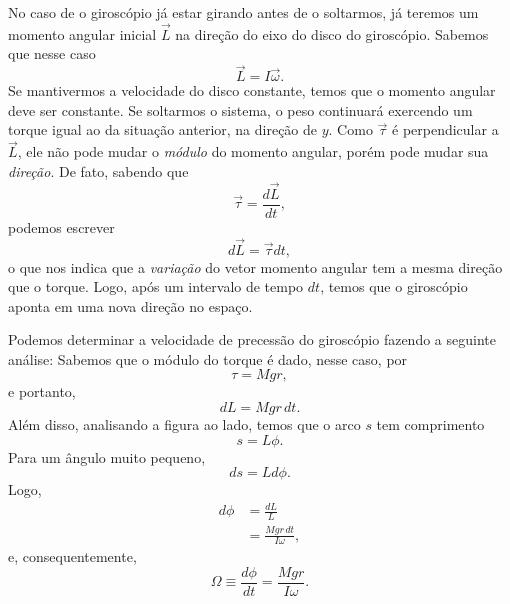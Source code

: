 No caso de o giroscópio já estar girando antes de o soltarmos, já teremos um momento angular inicial $\vec{L}$ na direção do eixo do disco do giroscópio. Sabemos que nesse caso 
\begin{equation}
  \vec{L} = I\vec{\omega}.
\end{equation}
%
Se mantivermos a velocidade do disco constante, temos que o momento angular deve ser constante. Se soltarmos o sistema, o peso continuará exercendo um torque igual ao da situação anterior, na direção de $y$. Como $\vec{\tau}$ é perpendicular a $\vec{L}$, ele não pode mudar o \emph{módulo} do momento angular, porém pode mudar sua \emph{direção}. De fato, sabendo que
\begin{equation}
  \vec{\tau} = \frac{d\vec{L}}{dt},
\end{equation}
%
podemos escrever
\begin{equation}
  d\vec{L} = \vec{\tau} dt,
\end{equation}
%
o que nos indica que a \emph{variação} do vetor momento angular tem a mesma direção que o torque. Logo, após um intervalo de tempo $dt$, temos que o giroscópio aponta em uma nova direção no espaço.

Podemos determinar a velocidade de precessão do giroscópio fazendo a seguinte análise: Sabemos que o módulo do torque é dado, nesse caso, por
\begin{equation}
  \tau = Mgr,
\end{equation}
%
e portanto,
\begin{equation}
  dL = Mgr\,dt.
\end{equation}
%
Além disso, analisando a figura ao lado, temos que o arco $s$ tem comprimento
\begin{equation}
  s = L \phi.
\end{equation}
%
Para um ângulo muito pequeno,
\begin{equation}
  ds = L d\phi.
\end{equation}
%
Logo,
\begin{align}
  d\phi &= \frac{dL}{L} \\
  &= \frac{Mgr\,dt}{I\omega},
\end{align}
%
e, consequentemente,
\begin{equation}
  \Omega \equiv \frac{d\phi}{dt} = \frac{Mgr}{I\omega}.
\end{equation}


